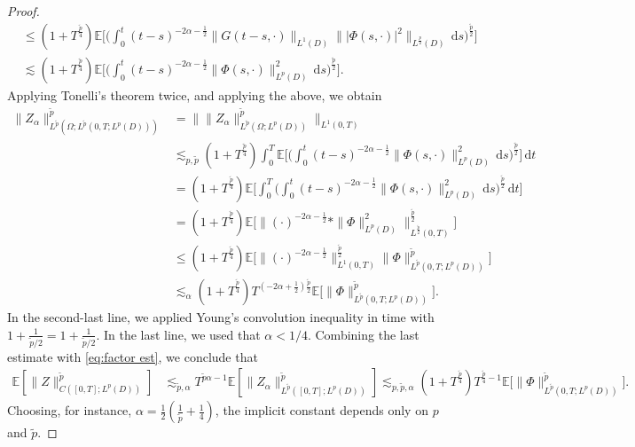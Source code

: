 \documentclass[10pt,a4paper]{amsart}
\numberwithin{equation}{section}
\newcommand{\E}{{\mathbb E}}
\newcommand{\Om}{\Omega}
\newcommand{\dd}{\,\mathrm{d}}
\begin{document}
\begin{proof}
\begin{align*}
&\leq (1+T^{\frac{\tilde p}{4}})\E\bigg[\Big(  \int_0^t (t-s)^{-2\alpha-\frac12}\big\|G (t-s,\cdot)\|_{L^1(D)}\||\Phi(s,\cdot)|^2 \|_{L^{\frac{p}{2}}(D)} \dd s \Big)^{\frac{\tilde p}{2}} \bigg]\\
&\lesssim (1+T^{\frac{\tilde p}{4}})\E\bigg[\Big(  \int_0^t (t-s)^{-2\alpha-\frac12} \|\Phi(s,\cdot) \|_{L^{p}(D)}^2 \dd s \Big)^{\frac{\tilde p}{2}} \bigg].
\end{align*}  
Applying  Tonelli's theorem twice, and applying the above, we obtain
\begin{align*}
    \| Z_\alpha\|_{L^{\tilde p}(\Om ;L^{{\tilde p}}(0,T;L^p(D)))}^{{\tilde p}} &= \| \|Z_\alpha \|_{L^{\tilde p}(\Om;L^p(D))}^{\tilde p}\|_{L^{1}(0,T)} \\
    &\lesssim_{p, \tilde p }(1+T^{\frac{\tilde p}{4}}) \int_0^T  \E\bigg[\Big(  \int_0^t (t-s)^{-2\alpha-\frac12} \|\Phi(s,\cdot) \|_{L^{p}(D)}^2 \dd s \Big)^{\frac{\tilde p}{2}} \bigg] \dd t\\
    &= (1+T^{\frac{\tilde p}{4}}) \E\bigg[\int_0^T\Big(  \int_0^t (t-s)^{-2\alpha-\frac12} \|\Phi(s,\cdot) \|_{L^{p}(D)}^2 \dd s \Big)^{\frac{\tilde p}{2}}\dd t \bigg] \\
    &= (1+T^{\frac{\tilde p}{4}})\E\Big[\big\| (\cdot)^{-2\alpha-\frac12}* \|\Phi \|_{L^{p}(D)}^2 \big\|_{L^{\frac{\tilde p}{2}}(0,T)}^ {\frac{\tilde p}{2}}\Big]\\
    &\leq(1+T^{\frac{\tilde p}{4}}) \E\big[ \|(\cdot)^{-2\alpha-\frac12}\|_{L^1(0,T)}^{\frac{\tilde p}{2}} \|\Phi \|_{L^{ {\tilde p} }(0,T;L^p(D))}^{\tilde p }\big]\\
    &\lesssim_\alpha(1+T^{\frac{\tilde p}{4}}) T^{(-2\alpha+\frac12)\frac{\tilde p}{2}}\E\big[\|\Phi \|_{L^{\tilde p}(0,T;L^p(D))}^{\tilde p}\big].
\end{align*}  
In the second-last line, we applied Young's convolution inequality in time with $1+\frac{1}{\tilde p/2}=1+\frac{1}{\tilde p/2}$. In the last line, we used that $\alpha<1/4$. 
Combining the last estimate with \eqref{eq:factor est}, we conclude that
\begin{align*}
\E[\|Z\|_{C([0,T];L^p(D))}^{\tilde p}]
&\lesssim_{\tilde p,\alpha} T^{\tilde p \alpha-1}\E[\|Z_\alpha\|_{L^{\tilde p}([0,T];L^p(D))}^{\tilde p}]
\lesssim_{p,\tilde p,\alpha} (1+T^{\frac{\tilde p}{4}})T^{ \frac{\tilde p}{4}-1}\E\big[\|\Phi \|_{L^{\tilde p}(0,T;L^p(D))}^{\tilde p}\big].
\end{align*}
Choosing, for instance, $\alpha=\frac12(\frac{1}{\tilde p}+\frac14)$, the implicit constant depends only on $p$ and $\tilde p$. 
\end{proof}
\end{document}
